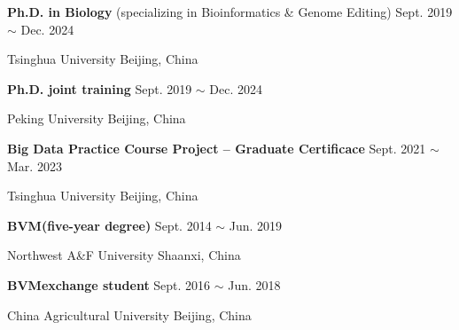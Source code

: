 

\renewcommand{\thefootnote}{\fnsymbol{footnote}}
\setcounter{footnote}{0}
    \textbf{Ph.D. in Biology\footnotemark[1]} (specializing in Bioinformatics \& Genome Editing) \hfill Sept. 2019 $\sim$ Dec. 2024\footnotemark[2]

    Tsinghua University \hfill Beijing, China
    
    \textbf{Ph.D. joint training\footnotemark[1]} \hfill Sept. 2019 $\sim$ Dec. 2024\footnotemark[2]
    
    Peking University \hfill Beijing, China

    \textbf{Big Data Practice Course Project -- Graduate Certificace} \hfill Sept. 2021 $\sim$ Mar. 2023
    
    Tsinghua University \hfill Beijing, China

    \textbf{BVM\footnotemark[3] (five-year degree)} \hfill Sept. 2014 $\sim$ Jun. 2019
    
    Northwest A\&F University \hfill Shaanxi, China

    \textbf{BVM\footnotemark[3] exchange student} \hfill Sept. 2016 $\sim$ Jun. 2018
    
    China Agricultural University \hfill Beijing, China

\renewcommand{\thefootnote}{\arabic{footnote}}
\setcounter{footnote}{1}
